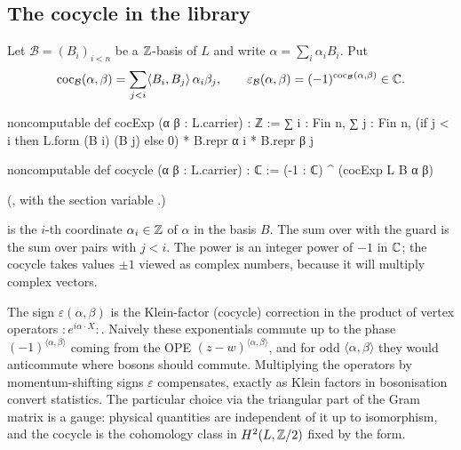 \subsection{The cocycle in the library}

\begin{definition}\label{ch03:def:cocExp}
Let $\mathcal B=(B_i)_{i<n}$ be a ${\mathbb{Z}}$-basis of $L$ and write $\alpha=\sum_i\alpha_iB_i$. Put
\begin{equation*}
  \operatorname{coc}_{\mathcal B}(\alpha,\beta)=\sum_{j<i}\langle B_i,B_j\rangle\,\alpha_i\beta_j,\qquad
  \varepsilon_{\mathcal B}(\alpha,\beta)=(-1)^{\operatorname{coc}_{\mathcal B}(\alpha,\beta)}\in{\mathbb{C}} .
\end{equation*}
\end{definition}
\begin{leancode}
noncomputable def cocExp (α β : L.carrier) : ℤ :=
  ∑ i : Fin n, ∑ j : Fin n,
    (if j < i then L.form (B i) (B j) else 0) * B.repr α i * B.repr β j

noncomputable def cocycle (α β : L.carrier) : ℂ := (-1 : ℂ) ^ (cocExp L B α β)
\end{leancode}
(, with the section variable
.)

\begin{dictionary}
 is the $i$-th coordinate $\alpha_i\in{\mathbb{Z}}$ of $\alpha$ in the basis $B$. The sum
over  with the guard  is the sum over pairs with $j<i$. The power
 is an integer power of $-1$ in ${\mathbb{C}}$; the cocycle takes values $\pm1$
viewed as complex numbers, because it will multiply complex vectors.
\end{dictionary}

\begin{physics}
The sign $\varepsilon(\alpha,\beta)$ is the Klein-factor (cocycle) correction in the product of vertex operators $:\!e^{i\alpha\cdot X}\!:$. Naively these exponentials commute up to the phase $(-1)^{\langle\alpha,\beta\rangle}$ coming from the OPE $(z-w)^{\langle\alpha,\beta\rangle}$, and for odd $\langle\alpha,\beta\rangle$ they would anticommute where bosons should commute. Multiplying the operators by momentum-shifting signs $\varepsilon$ compensates, exactly as Klein factors in bosonisation convert statistics. The particular choice via the triangular part of the Gram matrix is a gauge: physical quantities are independent of it up to isomorphism, and the cocycle is the cohomology class in $H^2(L,{\mathbb{Z}}/2)$ fixed by the form.
\end{physics}


